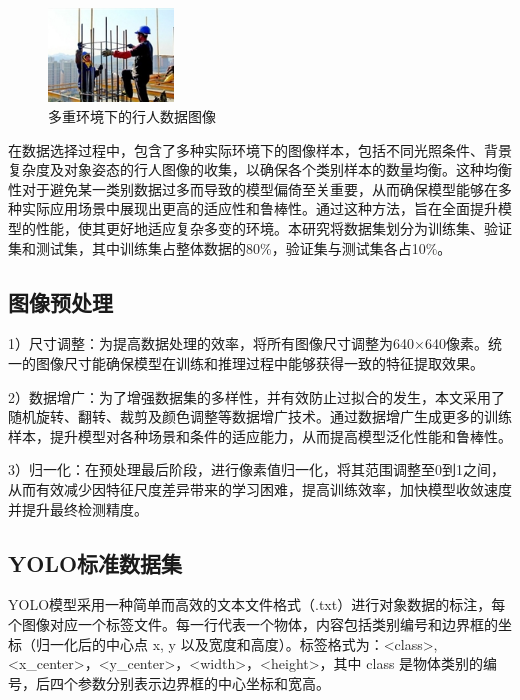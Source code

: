 \documentclass[journal]{IEEEtran}
\numberwithin{figure}{section}%
\begin{document}
\begin{figure}[h]
\begin{minipage}{0.32\linewidth}
		\centerline{\includegraphics[width=\textwidth,height=2.5cm]{figures/2_6.jpg}}
	\end{minipage}
 
	\caption{多重环境下的行人数据图像}
	\label{fig4}
\end{figure}

在数据选择过程中，包含了多种实际环境下的图像样本，包括不同光照条件、背景复杂度及对象姿态的行人图像的收集，以确保各个类别样本的数量均衡。这种均衡性对于避免某一类别数据过多而导致的模型偏倚至关重要，从而确保模型能够在多种实际应用场景中展现出更高的适应性和鲁棒性。通过这种方法，旨在全面提升模型的性能，使其更好地适应复杂多变的环境。本研究将数据集划分为训练集、验证集和测试集，其中训练集占整体数据的80\%，验证集与测试集各占10\%。
\subsection{图像预处理}
1）尺寸调整：为提高数据处理的效率，将所有图像尺寸调整为640×640像素。统一的图像尺寸能确保模型在训练和推理过程中能够获得一致的特征提取效果。\par
2）数据增广：为了增强数据集的多样性，并有效防止过拟合的发生，本文采用了随机旋转、翻转、裁剪及颜色调整等数据增广技术。通过数据增广生成更多的训练样本，提升模型对各种场景和条件的适应能力，从而提高模型泛化性能和鲁棒性。\par
3）归一化：在预处理最后阶段，进行像素值归一化，将其范围调整至0到1之间，从而有效减少因特征尺度差异带来的学习困难，提高训练效率，加快模型收敛速度并提升最终检测精度。
\subsection{YOLO标准数据集}
YOLO模型采用一种简单而高效的文本文件格式（.txt）进行对象数据的标注，每个图像对应一个标签文件。每一行代表一个物体，内容包括类别编号和边界框的坐标（归一化后的中心点 x, y 以及宽度和高度）。标签格式为：\textless class\textgreater, \textless x\_center\textgreater，\textless y\_center\textgreater，\textless width\textgreater，\textless height\textgreater，其中 class 是物体类别的编号，后四个参数分别表示边界框的中心坐标和宽高。
\end{document}
